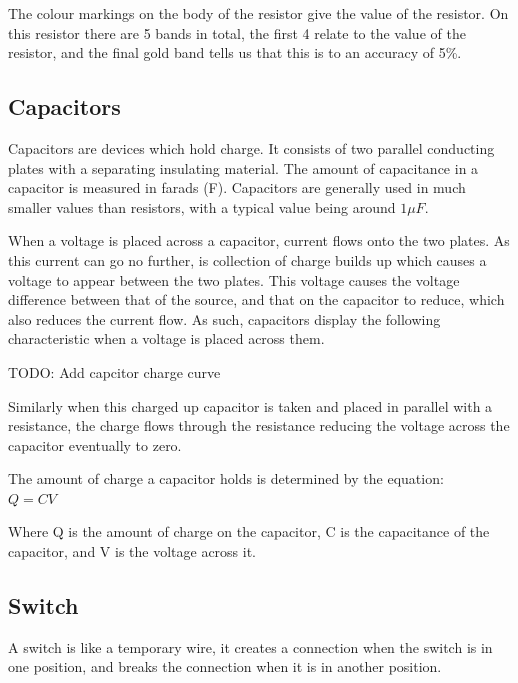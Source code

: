 The colour markings on the body of the resistor give the value of the resistor.
On this resistor there are 5 bands in total, the first 4 relate to the value of the resistor, and the final gold band tells us that this is to an accuracy of 5\%.

%

\subsection{Capacitors}
Capacitors are devices which hold charge.
It consists of two parallel conducting plates with a separating insulating material.
The amount of capacitance in a capacitor is measured in farads (F).
Capacitors are generally used in much smaller values than resistors, with a typical value being around $1\mu F$.

When a voltage is placed across a capacitor, current flows onto the two plates.
As this current can go no further, is collection of charge builds up which causes a voltage to appear between the two plates.
This voltage causes the voltage difference between that of the source, and that on the capacitor to reduce, which also reduces the current flow.
As such, capacitors display the following characteristic when a voltage is placed across them.

TODO: Add capcitor charge curve

Similarly when this charged up capacitor is taken and placed in parallel with a resistance, the charge flows through the resistance reducing the voltage across the capacitor eventually to zero.

The amount of charge a capacitor holds is determined by the equation:\\
$Q=CV$

Where Q is the amount of charge on the capacitor, C is the capacitance of the capacitor, and V is the voltage across it.


\subsection{Switch}
A switch is like a temporary wire, it creates a connection when the switch is in one position, and breaks the connection when it is in another position.


